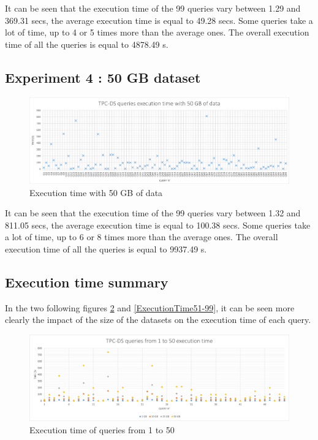 \documentclass{article}
\begin{document}
It can be seen that the execution time of the 99 queries vary between 1.29 and 369.31 secs, the average execution time is equal to 49.28 secs. Some queries take a lot of time, up to 4 or 5 times more than the average ones. The overall execution time of all the queries is equal to 4878.49 s.

\subsection{Experiment 4 : 50 GB dataset}

\begin{figure}[H] 
\begin{adjustwidth}{-2cm}{-2cm}
\begin{center}
\includegraphics[width=20cm]{images/ExecutionTime50GB.png}
\end{center}
\end{adjustwidth}
\caption{Execution time with 50 GB of data}
\label{ExecutionTime50GB}
\end{figure}

It can be seen that the execution time of the 99 queries vary between 1.32 and 811.05 secs, the average execution time is equal to 100.38 secs. Some queries take a lot of time, up to 6 or 8 times more than the average ones. The overall execution time of all the queries is equal to 9937.49 s.


\subsection{Execution time summary}


In the two following figures \ref{ExecutionTime1-50} and \ref{ExecutionTime51-99}, it can be seen more clearly the impact of the size of the datasets on the execution time of each query.


\begin{figure}[H] 
\begin{adjustwidth}{-2cm}{-2cm}
\begin{center}
\includegraphics[width=20cm]{images/ExecutionTime1-50.png}
\end{center}
\end{adjustwidth}
\caption{Execution time of queries from 1 to 50}
\label{ExecutionTime1-50}
\end{figure}
\end{document}
